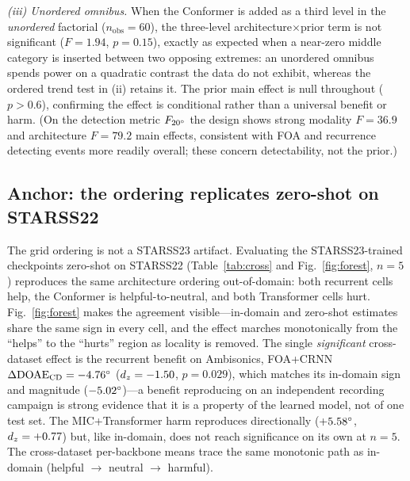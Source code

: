 \emph{(iii) Unordered omnibus.} When the Conformer is added as a third level in the
\emph{unordered} factorial ($n_{\text{obs}}=60$), the three-level
architecture$\times$prior term is not significant ($F=1.94$, $p=0.15$), exactly as
expected when a near-zero middle category is inserted between two opposing extremes:
an unordered omnibus spends power on a quadratic contrast the data do not exhibit,
whereas the ordered trend test in (ii) retains it. The prior main effect is null
throughout ($p>0.6$), confirming the effect is conditional rather than a universal
benefit or harm. (On the detection metric $F_{20^\circ}$ the design shows strong
modality $F=36.9$ and architecture $F=79.2$ main effects, consistent with FOA and
recurrence detecting events more readily overall; these concern detectability, not
the prior.)

\subsection{Anchor: the ordering replicates zero-shot on STARSS22}
\label{sec:cross}
The grid ordering is not a STARSS23 artifact. Evaluating the STARSS23-trained
checkpoints zero-shot on STARSS22 (Table~\ref{tab:cross} and
Fig.~\ref{fig:forest}, $n=5$) reproduces the same architecture ordering
out-of-domain: both recurrent cells help, the Conformer is helpful-to-neutral,
and both Transformer cells hurt. Fig.~\ref{fig:forest} makes the agreement
visible---in-domain and zero-shot estimates share the same sign in every cell,
and the effect marches monotonically from the ``helps'' to the ``hurts'' region
as locality is removed. The single
\emph{significant} cross-dataset effect is the recurrent benefit on Ambisonics,
FOA+CRNN $\Delta\text{DOAE}_\mathrm{CD}=-4.76^\circ$ ($d_z=-1.50$, $p=0.029$),
which matches its in-domain sign and magnitude ($-5.02^\circ$)---a benefit
reproducing on an independent recording campaign is strong evidence that it is a
property of the learned model, not of one test set. The MIC+Transformer harm
reproduces directionally ($+5.58^\circ$, $d_z=+0.77$) but, like in-domain, does
not reach significance on its own at $n=5$. The cross-dataset per-backbone means
trace the same monotonic path as in-domain (helpful $\to$ neutral $\to$ harmful).

